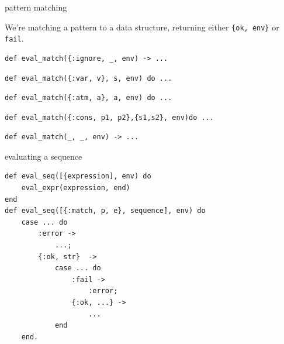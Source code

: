 \begin{frame}[fragile]{pattern matching}

We're matching a pattern to a data structure, returning either \verb+{ok, env}+ or \verb+fail+.

\begin{verbatim}
def eval_match({:ignore, _, env) -> ...
\end{verbatim}
\pause
\begin{verbatim}
def eval_match({:var, v}, s, env) do ... 
\end{verbatim}
\pause
\begin{verbatim}
def eval_match({:atm, a}, a, env) do ...
\end{verbatim}
\pause
\begin{verbatim}
def eval_match({:cons, p1, p2},{s1,s2}, env)do ... 
\end{verbatim}
\pause
\begin{verbatim}
def eval_match(_, _, env) -> ...
\end{verbatim}

\end{frame}

\begin{frame}[fragile]{evaluating a sequence}

\begin{verbatim}
def eval_seq([{expression], env) do
    eval_expr(expression, end)
end
def eval_seq([{:match, p, e}, sequence], env) do
    case ... do
        :error -> 
            ...;
        {:ok, str}  ->
            case ... do
                :fail ->
                    :error;
                {:ok, ...} ->
                    ...
            end
    end.
\end{verbatim}


\end{frame}

